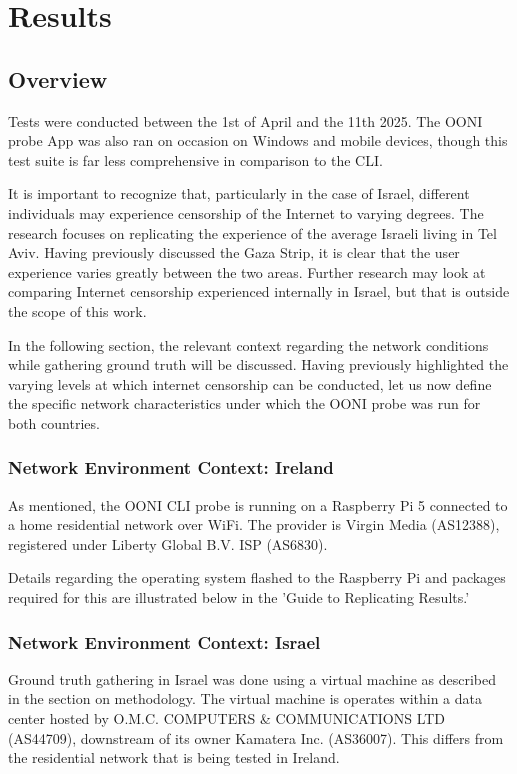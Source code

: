 \chapter{Results}
\section{Overview}
Tests were conducted between the 1st of April and the 11th 2025. The OONI probe App was also ran on occasion on Windows and mobile devices, though this test suite is far less comprehensive in comparison to the CLI. 

It is important to recognize that, particularly in the case of Israel, different individuals may experience censorship of the Internet to varying degrees. The research focuses on replicating the experience of the average Israeli living in Tel Aviv. Having previously discussed the Gaza Strip, it is clear that the user experience varies greatly between the two areas. Further research may look at comparing Internet censorship experienced internally in Israel, but that is outside the scope of this work.

In the following section, the relevant context regarding the network conditions while gathering ground truth will be discussed. Having previously highlighted the varying levels at which internet censorship can be conducted, let us now define the specific network characteristics under which the OONI probe was run for both countries.

\subsection{Network Environment Context: Ireland}
As mentioned, the OONI CLI probe is running on a Raspberry Pi 5 connected to a home residential network over WiFi. The provider is Virgin Media (AS12388), registered under Liberty Global B.V. ISP (AS6830). 

Details regarding the operating system flashed to the Raspberry Pi and packages required for this are illustrated below in the 'Guide to Replicating Results.' 

\subsection{Network Environment Context: Israel}
Ground truth gathering in Israel was done using a virtual machine as described in the section on methodology. The virtual machine is operates within a data center hosted by O.M.C. COMPUTERS \& COMMUNICATIONS LTD (AS44709), downstream of its owner Kamatera Inc. (AS36007). This differs from the residential network that is being tested in Ireland.


